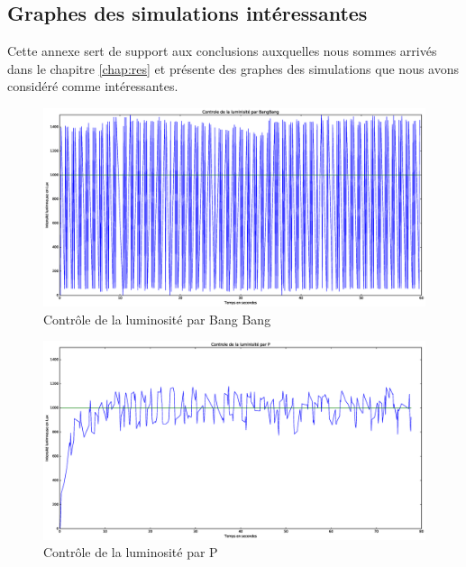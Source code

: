 \documentclass[a4paper,10pt]{report}
\begin{document}
\begin{appendices}

\chapter{Graphes des simulations intéressantes}


Cette annexe sert de support aux conclusions auxquelles nous sommes arrivés dans le chapitre \ref{chap:res} et présente des graphes des simulations que nous avons considéré comme intéressantes.

\begin{figure}[htb!]
   \centering
   \includegraphics[scale=0.35]{BangBang.eps}
   \caption{\label{fig:Bang Bang} Contrôle de la luminosité par Bang Bang}
\end{figure}

\begin{figure}[htb!]
   \centering
   \includegraphics[scale=0.35]{P.eps}
   \caption{\label{fig:p} Contrôle de la luminosité par P}
\end{figure}


\end{appendices}
\end{document}
